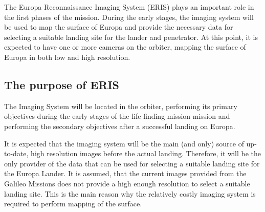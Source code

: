 The Europa Reconnaissance Imaging System (ERIS) plays an important role in the first phases of the mission. During the early stages, the imaging system will be used to map the surface of Europa and provide the necessary data for selecting a suitable landing site for the lander and penetrator. At this point, it is expected to have one or more cameras on the orbiter, mapping the surface of Europa in both low and high resolution. 
\subsection{The purpose of ERIS}
The Imaging System will be located in the orbiter, performing its primary objectives during the early stages of the life finding mission mission and performing the secondary objectives after a successful landing on Europa.

It is expected that the imaging system will be the main (and only) source of up-to-date, high resolution images before the actual landing. Therefore, it will be the only provider of the data that can be used for selecting a suitable landing site for the Europa Lander. It is assumed, that the current images provided from the Galileo Missions does not provide a high enough resolution to select a suitable landing site. This is the main reason why the relatively costly imaging system is required to perform mapping of the surface. 
